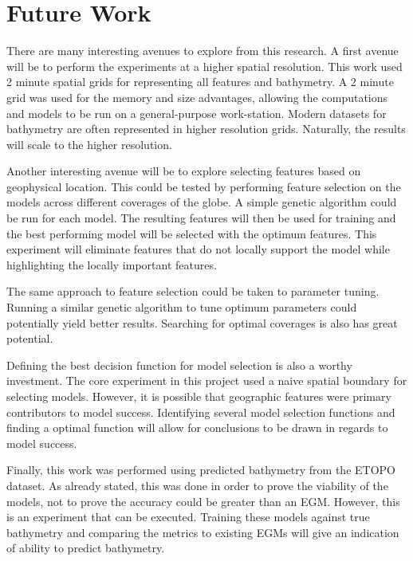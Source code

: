 \section{Future Work}
\setlength{\parindent}{10ex}
There are many interesting avenues to explore from this research.
A first avenue will be to perform the experiments at a higher spatial resolution.
This work used 2 minute spatial grids for representing all features and bathymetry.
A 2 minute grid was used for the memory and size advantages, allowing the computations and models to be run on a general-purpose work-station.
Modern datasets for bathymetry are often represented in higher resolution grids.
Naturally, the results will scale to the higher resolution.

\par
Another interesting avenue will be to explore selecting features based on geophysical location.
This could be tested by performing feature selection on the models across different coverages of the globe.
A simple genetic algorithm could be run for each model.
The resulting features will then be used for training and the best performing model will be selected with the optimum features.
This experiment will eliminate features that do not locally support the model while highlighting the locally important features.

\par
The same approach to feature selection could be taken to parameter tuning.
Running a similar genetic algorithm to tune optimum parameters could potentially yield better results.
Searching for optimal coverages is also has great potential.

\par 
Defining the best decision function for model selection is also a worthy investment.
The core experiment in this project used a naive spatial boundary for selecting models.
However, it is possible that geographic features were primary contributors to model success.
Identifying several model selection functions and finding a optimal function will allow for conclusions to be drawn in regards to model success.

\par
Finally, this work was performed using predicted bathymetry from the ETOPO dataset.
As already stated, this was done in order to prove the viability of the models, not to prove the accuracy could be greater than an \ac{EGM}.
However, this is an experiment that can be executed.
Training these models against true bathymetry and comparing the metrics to existing \ac{EGM}s will give an indication of ability to predict bathymetry.